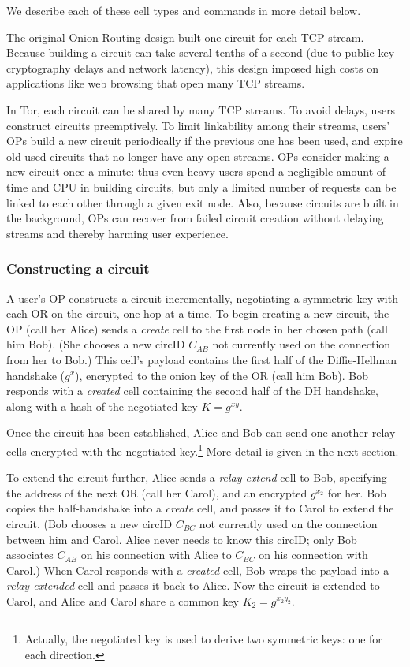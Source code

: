 \documentclass[times,10pt,twocolumn]{article}
\begin{document}
We describe each of these cell types and commands in more detail below.

\label{subsec:circuits}

The original Onion Routing design built one circuit for each
TCP stream.  Because building a circuit can take several tenths of a
second (due to public-key cryptography delays and network latency),
this design imposed high costs on applications like web browsing that
open many TCP streams.

In Tor, each circuit can be shared by many TCP streams.  To avoid
delays, users construct circuits preemptively.  To limit linkability
among their streams, users' OPs build a new circuit
periodically if the previous one has been used,
and expire old used circuits that no longer have any open streams.
OPs consider making a new circuit once a minute: thus
even heavy users spend a negligible amount of time and CPU in
building circuits, but only a limited number of requests can be linked
to each other through a given exit node. Also, because circuits are built
in the background, OPs can recover from failed circuit creation
without delaying streams and thereby harming user experience.

\subsubsection{Constructing a circuit}
\label{subsubsec:constructing-a-circuit}

A user's OP constructs a circuit incrementally, negotiating a
symmetric key with each OR on the circuit, one hop at a time. To begin
creating a new circuit, the OP (call her Alice) sends a
\emph{create} cell to the first node in her chosen path (call him Bob).  
(She chooses a new
circID $C_{AB}$ not currently used on the connection from her to Bob.)
This cell's
payload contains the first half of the Diffie-Hellman handshake
($g^x$), encrypted to the onion key of the OR (call him Bob). Bob
responds with a \emph{created} cell containing the second half of the
DH handshake, along with a hash of the negotiated key $K=g^{xy}$.

Once the circuit has been established, Alice and Bob can send one
another relay cells encrypted with the negotiated
key.\footnote{Actually, the negotiated key is used to derive two
  symmetric keys: one for each direction.}  More detail is given in
the next section.

To extend the circuit further, Alice sends a \emph{relay extend} cell
to Bob, specifying the address of the next OR (call her Carol), and
an encrypted $g^{x_2}$ for her.  Bob copies the half-handshake into a
\emph{create} cell, and passes it to Carol to extend the circuit.
(Bob chooses a new circID $C_{BC}$ not currently used on the connection
between him and Carol.  Alice never needs to know this circID; only Bob
associates $C_{AB}$ on his connection with Alice to $C_{BC}$ on
his connection with Carol.)
When Carol responds with a \emph{created} cell, Bob wraps the payload
into a \emph{relay extended} cell and passes it back to Alice.  Now
the circuit is extended to Carol, and Alice and Carol share a common key
$K_2 = g^{x_2 y_2}$.
\end{document}
